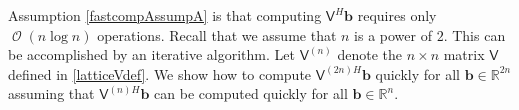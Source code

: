 \documentclass{iitthesis}          %
\DeclareMathOperator{\Order}{{\mathcal O}}
\newcommand{\bm}[1]{\boldsymbol{#1}}
\newcommand{\reals}{\mathbb{R}}
\newcommand{\vtheta}{{\bm{\theta}}}
\newcommand{\vb}{\bm{b}}
\newcommand{\mP}{\mathsf{P}}
\newcommand{\mV}{\mathsf{V}}
\newcommand{\mW}{\mathsf{W}}
\begin{document}








\iffalse
\label{sec:iter_fft}
Assumption \eqref{fastcompAssumpA} is that computing $\mV^H \vb$ requires only $\Order(n \log n) $ operations.  Recall that we assume that $n$ is a power of $2$.  This can be accomplished by an iterative algorithm.  Let $\mV^{(n)}$ denote the $n \times n$ matrix $\mV$ defined in  \eqref{latticeVdef}.  We show how to compute $\mV^{(2n)H}\vb$ quickly for all $\vb \in \reals^{2n}$ assuming that $\mV^{(n)H}\vb$ can be computed quickly for all $\vb \in \reals^n$.
\end{document}
